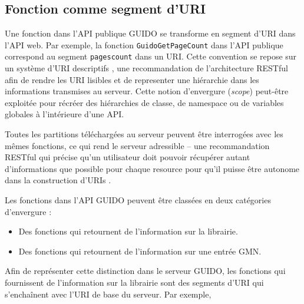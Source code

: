 \documentclass{article}
\begin{document}
\subsection{Fonction comme segment d'URI}
Une fonction dans l'API publique GUIDO se transforme en segment d'URI dans l'API web. Par exemple, la fonction \verb=GuidoGetPageCount= dans l'API publique correspond au segment \verb=pagescount= dans un URI.
Cette convention se repose sur un système d'URI descriptifs \cite{richardson2008restful}, une recommandation de l'architecture RESTful afin de rendre les URI lisibles et de representer une hiérarchie dans les informations transmises au serveur. Cette notion d'envergure (\emph{scope}) peut-être exploitée pour récréer des hiérarchies de classe, de namespace ou de variables globales à l'intérieure d'une API.\par
Toutes les partitions téléchargées au serveur peuvent être interrogées avec les mêmes fonctions, ce qui rend le serveur \og{}adressible\fg{} -- une recommandation RESTful qui précise qu'un utilisateur doit pouvoir récupérer autant d'informations que possible pour chaque resource pour qu'il puisse être autonome dans la construction d'URIs \cite{richardson2008restful}.\par
Les fonctions dans l'API GUIDO peuvent être classées en deux catégories d'envergure :
\begin{itemize}[noitemsep]
\item Des fonctions qui retournent de l'information sur la librairie.
\item Des fonctions qui retournent de l'information sur une entrée GMN.
\end{itemize}
Afin de représenter cette distinction dans le serveur GUIDO, les fonctions qui fournissent de l'information sur la librairie sont des segments d'URI qui s'enchaînent avec l'URI de base du serveur. Par exemple,
\end{document}
